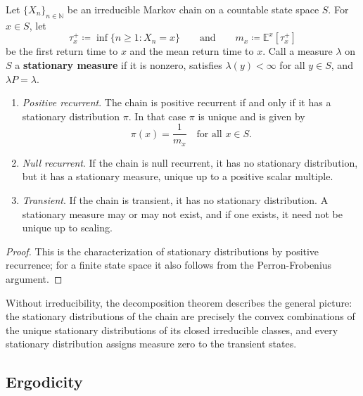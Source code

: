 	\begin{theorem}
		\label{thm:existence-and-uniqueness-of-the-stationary-distribution}
		Let $\{X_n\}_{n \in \mathbb{N}}$ be an irreducible Markov chain on a countable state space $S$. For $x \in S$, let
		\begin{equation}
			\tau_x^+ \coloneqq \inf\{n \geq 1 : X_n = x\}
			\qquad \text{and} \qquad
			m_x \coloneqq \mathbb{E}^x[\tau_x^+]
		\end{equation}
		be the first return time to $x$ and the mean return time to $x$. Call a measure $\lambda$ on $S$ a \textbf{stationary measure} if it is nonzero, satisfies $\lambda(y) < \infty$ for all $y \in S$, and $\lambda P = \lambda$.
		\begin{enumerate}
			\item \textit{Positive recurrent}. The chain is positive recurrent if and only if it has a stationary distribution $\pi$. In that case $\pi$ is unique and is given by
				\begin{equation}
					\pi(x) = \frac{1}{m_x} \quad \text{for all } x \in S.
				\end{equation}
			\item \textit{Null recurrent}. If the chain is null recurrent, it has no stationary distribution, but it has a stationary measure, unique up to a positive scalar multiple.
			\item \textit{Transient}. If the chain is transient, it has no stationary distribution. A stationary measure may or may not exist, and if one exists, it need not be unique up to scaling.
		\end{enumerate}
	\end{theorem}
	\begin{proof}
		This is the characterization of stationary distributions by positive recurrence; for a finite state space it also follows from the Perron-Frobenius argument.
	\end{proof}

	Without irreducibility, the decomposition theorem describes the general picture: the stationary distributions of the chain are precisely the convex combinations of the unique stationary distributions of its closed irreducible classes, and every stationary distribution assigns measure zero to the transient states.

\subsection{Ergodicity}

